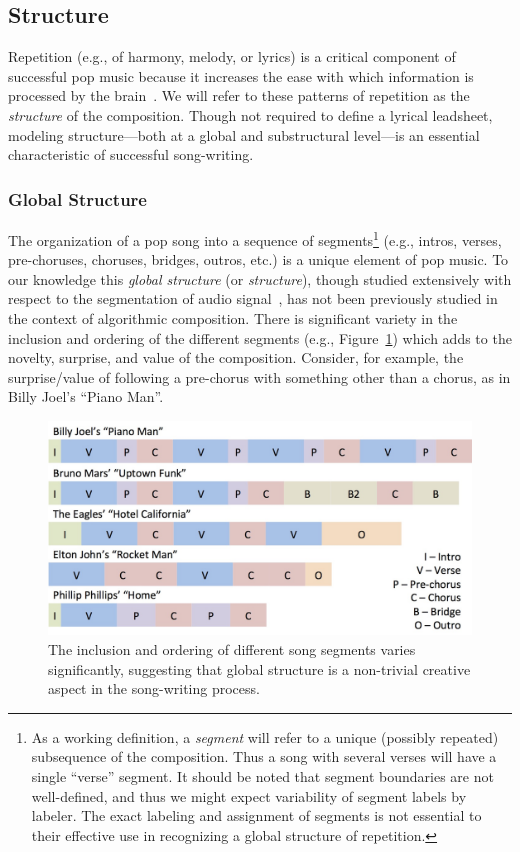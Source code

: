 \documentclass[11pt,phd]{byuprop}
\begin{document}
\subsection{Structure}

Repetition (e.g., of harmony, melody, or lyrics) is a critical component of successful pop music because it increases the ease with which information is processed by the brain~\cite{nunes2015power}.  We will refer to these patterns of repetition as the \emph{structure} of the composition. Though not required to define a lyrical leadsheet, modeling structure---both at a global and substructural level---is an essential characteristic of successful song-writing. 

\subsubsection{Global Structure}

The organization of a pop song into a sequence of segments\footnote{As a working definition, a \emph{segment} will refer to a unique (possibly repeated) subsequence of the composition. Thus a song with several verses will have a single ``verse'' segment. It should be noted that segment boundaries are not well-defined, and thus we might expect variability of segment labels by labeler. The exact labeling and assignment of segments is not essential to their effective use in recognizing a global structure of repetition.} (e.g., intros, verses, pre-choruses, choruses, bridges, outros, etc.) is a unique element of pop music. To our knowledge this \emph{global structure} (or \emph{structure}), though studied extensively with respect to the segmentation of audio signal~\cite{foote2000automatic}, has not been previously studied in the context of algorithmic composition. There is significant variety in the inclusion and ordering of the different segments (e.g., Figure~\ref{fig:segment_variety}) which adds to the novelty, surprise, and value of the composition. Consider, for example, the surprise/value of following a pre-chorus with something other than a chorus, as in Billy Joel's ``Piano Man''.

\begin{figure}
  \centering
  \includegraphics[width=.65\textwidth]{graphics/segment_variety.jpg}
  \caption{The inclusion and ordering of different song segments varies significantly, suggesting that global structure is a non-trivial creative aspect in the song-writing process.}
    \label{fig:segment_variety}
\end{figure}
\end{document}
